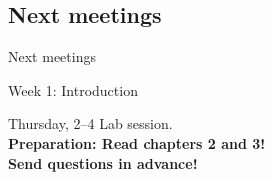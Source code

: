 \documentclass{beamer}
\begin{document}
\subsection{Next meetings}
\begin{frame}
Next meetings
\end{frame}


\begin{frame}{Week 1: Introduction}

\begin{block}{Thursday, 2--4}
Lab session.\\
\textbf{Preparation: Read chapters 2 and 3! \\ Send questions in advance!}

\end{block}


\end{frame}
%
%
%
%
%
%	
%	
%
%
\end{document}
